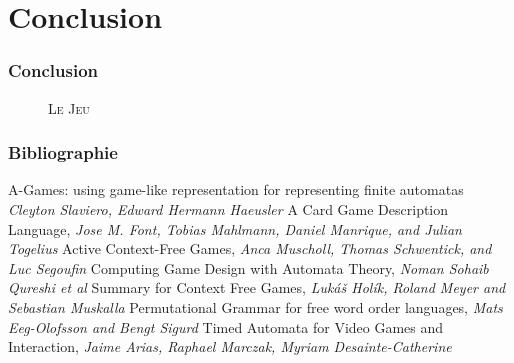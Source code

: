 \documentclass{beamercours}
\begin{document}
\section*{Conclusion}
\begin{frame}
    \frametitle{Conclusion}
    \begin{figure}[h]
        \centering
        \caption{\textsc{Le Jeu}}
        \label{fig:dfa:lejeu}
    \end{figure}
    

\end{frame}
\begin{frame}
    \frametitle{Bibliographie}

    \begin{thebibliography}{7}
        \scriptsize
         A-Games: using game-like representation for representing finite automatas \textit{Cleyton Slaviero, Edward Hermann Haeusler}
         A Card Game Description Language, \textit{Jose M. Font, Tobias Mahlmann, Daniel Manrique, and Julian Togelius}
         Active Context-Free Games, \textit{Anca Muscholl, Thomas Schwentick, and Luc Segoufin}
         Computing Game Design with Automata Theory, \textit{Noman Sohaib Qureshi et al}
         Summary for Context Free Games, \textit{Lukáš Holík, Roland Meyer and Sebastian Muskalla}
         Permutational Grammar for free word order languages, \textit{Mats Eeg-Olofsson and Bengt Sigurd}
         Timed Automata for Video Games and Interaction, \textit{Jaime Arias, Raphael Marczak, Myriam Desainte-Catherine}
    \end{thebibliography}


\end{frame}
\end{document}
